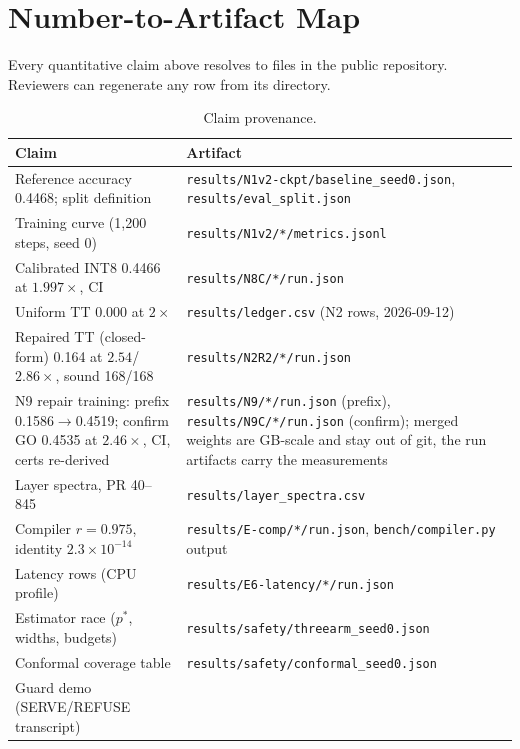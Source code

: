 \documentclass[conference,10pt]{IEEEtran}
\begin{document}
\appendix
\onecolumn

\section{Number-to-Artifact Map}
\label{app:map}
Every quantitative claim above resolves to files in the public repository.
Reviewers can regenerate any row from its directory.

\begin{table}[h]
\centering
\caption{Claim provenance.}
\label{tab:map}
\small
\begin{tabular}{@{}p{}p{}@{}}
\toprule
Claim & Artifact \\
\midrule
Reference accuracy 0.4468; split definition &
\texttt{results/N1v2-ckpt/baseline\_seed0.json}, \texttt{results/eval\_split.json} \\
Training curve (1{,}200 steps, seed 0) &
\texttt{results/N1v2/*/metrics.jsonl} \\
Calibrated INT8 0.4466 at $1.997\times$, CI &
\texttt{results/N8C/*/run.json} \\
Uniform TT 0.000 at $2\times$ &
\texttt{results/ledger.csv} (N2 rows, 2026-09-12) \\
Repaired TT (closed-form) 0.164 at $2.54$/$2.86\times$, sound 168/168 &
\texttt{results/N2R2/*/run.json} \\
N9 repair training: prefix 0.1586$\to$0.4519; confirm GO 0.4535 at
$2.46\times$, CI, certs re-derived &
\texttt{results/N9/*/run.json} (prefix),
\texttt{results/N9C/*/run.json} (confirm); merged weights are GB-scale and
stay out of git, the run artifacts carry the measurements \\
Layer spectra, PR 40--845 &
\texttt{results/layer\_spectra.csv} \\
Compiler $r = 0.975$, identity $2.3\times10^{-14}$ &
\texttt{results/E-comp/*/run.json}, \texttt{bench/compiler.py} output \\
Latency rows (CPU profile) &
\texttt{results/E6-latency/*/run.json} \\
Estimator race ($p^{*}$, widths, budgets) &
\texttt{results/safety/threearm\_seed0.json} \\
Conformal coverage table &
\texttt{results/safety/conformal\_seed0.json} \\
Guard demo (SERVE/REFUSE transcript) &

\end{tabular}
\end{table}
\end{document}
